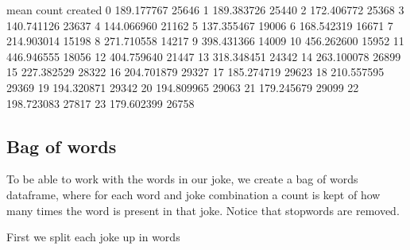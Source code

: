 \documentclass[letterpaper,10pt,english]{jupyterBook}
\begin{document}
\begin{sphinxVerbatim}[commandchars=\\\{\}]
  \PYG{p}{[} \PYG{p}{]}
\end{sphinxVerbatim}

\begin{sphinxVerbatim}[commandchars=\\\{\}]
               mean  count
created                   
0        189.177767  25646
1        189.383726  25440
2        172.406772  25368
3        140.741126  23637
4        144.066960  21162
5        137.355467  19006
6        168.542319  16671
7        214.903014  15198
8        271.710558  14217
9        398.431366  14009
10       456.262600  15952
11       446.946555  18056
12       404.759640  21447
13       318.348451  24342
14       263.100078  26899
15       227.382529  28322
16       204.701879  29327
17       185.274719  29623
18       210.557595  29369
19       194.320871  29342
20       194.809965  29063
21       179.245679  29099
22       198.723083  27817
23       179.602399  26758
\end{sphinxVerbatim}


\subsection{Bag of words}
\label{\detokenize{c7_case_studies/Jokes:bag-of-words}}
\sphinxAtStartPar
To be able to work with the words in our joke, we create a bag of words dataframe, where for each word and joke combination a count is kept of how many times the word is present in that joke. Notice that stopwords are removed.

\sphinxAtStartPar
First we split each joke up in words

\begin{sphinxVerbatim}[commandchars=\\\{\}]
  
\end{sphinxVerbatim}
\end{document}

